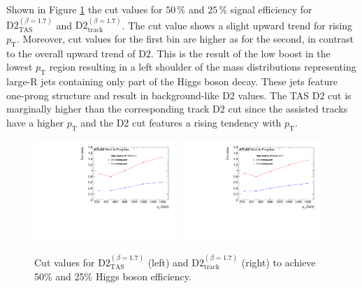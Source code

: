 Shown in Figure \ref{fig:higgs_cut} the cut values for $50\,\%$ and $25\,\%$ signal efficiency for $\text{D2}_{\text{TAS}}^{(\beta=1.7)}$ and $\text{D2}_{\text{track}}^{(\beta=1.7)}$. The cut value shows a slight upward trend for rising $p_{\mathrm{T}}$. Moreover, cut values for the first bin are higher as for the second, in contrast to the overall upward trend of D2. This is the result of the low boost in the lowest $p_{\mathrm{T}}$ region resulting in a left shoulder of the mass distributions representing large-R jets containing only part of the Higgs boson decay. These jets feature one-prong structure and result in background-like D2 values. The TAS D2 cut is marginally higher than the corresponding track D2 cut since the assisted tracks have a higher $p_{\mathrm{T}}$ and the D2 cut features a rising tendency with $p_{\mathrm{T}}$. 
\begin{figure}
\includegraphics[width=0.48\textwidth]{sascha_input/plots/Higgs/cut_value/d2_tas17.pdf} \hspace{1mm}
\includegraphics[width=0.48\textwidth]{sascha_input/plots/Higgs/cut_value/d2_tracks17.pdf}
\caption{{Cut values for $\text{D2}_{\text{TAS}}^{(\beta=1.7)}$ (left) and $\text{D2}_{\text{track}}^{(\beta=1.7)}$ (right) to achieve 50\% and 25\% Higgs boson efficiency.}}\label{fig:higgs_cut}
\end{figure}

